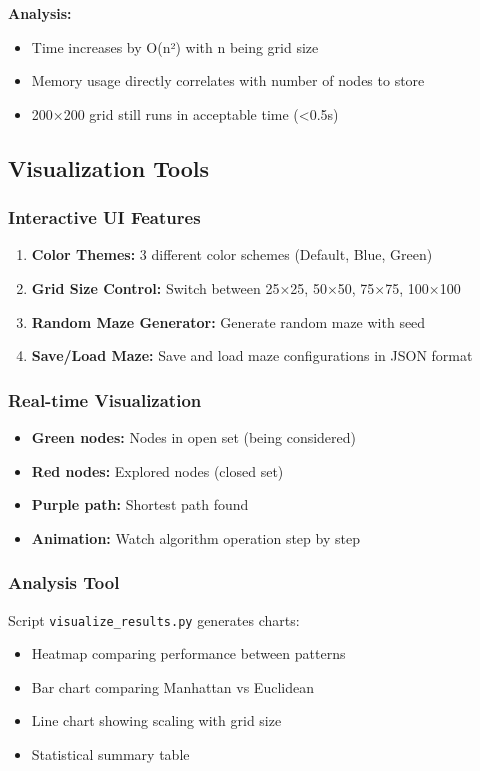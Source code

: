 \documentclass[12pt,a4paper]{article}
\begin{document}
\textbf{Analysis:}
\begin{itemize}
    \item Time increases by O(n²) with n being grid size
    \item Memory usage directly correlates with number of nodes to store
    \item 200×200 grid still runs in acceptable time (<0.5s)
\end{itemize}

\subsection{Visualization Tools}

\subsubsection{Interactive UI Features}
\begin{enumerate}
    \item \textbf{Color Themes:} 3 different color schemes (Default, Blue, Green)
    \item \textbf{Grid Size Control:} Switch between 25×25, 50×50, 75×75, 100×100
    \item \textbf{Random Maze Generator:} Generate random maze with seed
    \item \textbf{Save/Load Maze:} Save and load maze configurations in JSON format
\end{enumerate}

\subsubsection{Real-time Visualization}
\begin{itemize}
    \item \textbf{Green nodes:} Nodes in open set (being considered)
    \item \textbf{Red nodes:} Explored nodes (closed set)
    \item \textbf{Purple path:} Shortest path found
    \item \textbf{Animation:} Watch algorithm operation step by step
\end{itemize}

\subsubsection{Analysis Tool}
Script \texttt{visualize\_results.py} generates charts:
\begin{itemize}
    \item Heatmap comparing performance between patterns
    \item Bar chart comparing Manhattan vs Euclidean
    \item Line chart showing scaling with grid size
    \item Statistical summary table
\end{itemize}
\end{document}
